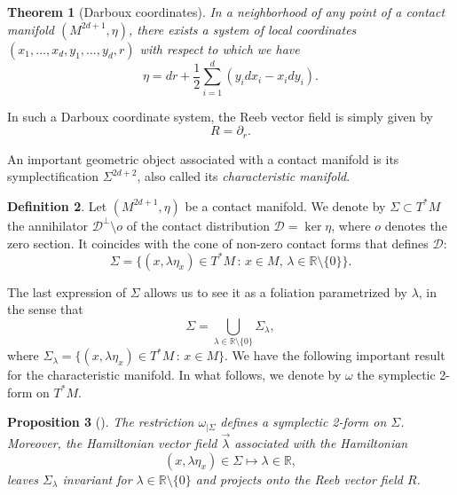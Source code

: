 \documentclass[12pt,a4paper]{amsart}
\theoremstyle{plain}
\newtheorem{theorem}{Theorem}[section]
\newtheorem{proposition}[theorem]{Proposition}
\theoremstyle{definition}
\newtheorem{definition}[theorem]{Definition}
\theoremstyle{remark}
\numberwithin{equation}{section}
\theoremstyle{definition}
\def\R{{\mathbb R}}%
\def \cD{\mathcal{D}}
\numberwithin{equation}{section}
\begin{document}
\begin{theorem}[Darboux coordinates]
 \label{thm:darboux}
 In a neighborhood of any point of a contact manifold $(M^{2d+1},\eta)$, there exists a system of local coordinates $(x_1,\dots,x_d,y_1,\dots,y_d,r)$ with 
 respect to which we have 
 \begin{equation*}
 \eta = dr + \frac{1}{2}\sum_{i=1}^d (y_i dx_i - x_i dy_i).
 \end{equation*}
\end{theorem}

In such a Darboux coordinate system, the Reeb vector field is simply given by 
\begin{equation*}
 R = \partial_r.
\end{equation*}

An important geometric object associated with a contact manifold is its symplectification $\Sigma^{2d+2}$, also called its \emph{characteristic manifold}.

\begin{definition}
    \label{def:characteristic}
    Let $(M^{2d+1},\eta)$ be a contact manifold. We denote by $\Sigma\subset T^* M$ the annihilator $\cD^\perp\setminus o$ of the contact distribution $\cD = \ker \eta$, where $o$ denotes the zero section. It coincides with the cone of non-zero contact forms that defines $\cD$:
    \begin{equation*}
        \Sigma = \{(x,\lambda \eta_x)\in T^* M\,:\,x\in M,\,\lambda\in\R\setminus\{0\}\}.
    \end{equation*}
\end{definition}

The last expression of $\Sigma$ allows us to see it as a foliation parametrized by $\lambda$, in the sense that 
\begin{equation*}
    \Sigma = \bigcup_{\lambda\in\R\setminus\{0\}} \Sigma_\lambda,
\end{equation*}
where $\Sigma_\lambda = \{(x,\lambda\eta_x)\in T^* M\,:\,x\in M\}$. We have the following important result for the characteristic manifold. In what follows, we denote by $\omega$ the symplectic 2-form on $T^* M$.

\begin{proposition}[\cite{CdVHT18}]
    \label{prop:hamliftReeb}
    The restriction $\omega_{|\Sigma}$ defines a symplectic 2-form on $\Sigma$. Moreover, the Hamiltonian vector field $\Vec{\lambda}$ associated with the Hamiltonian $$ (x,\lambda\eta_x)\in\Sigma \mapsto \lambda\in\R,$$ leaves $\Sigma_\lambda$ invariant for $\lambda\in\R\setminus\{0\}$ and projects onto the Reeb vector field $R$.
\end{proposition}
\end{document}
